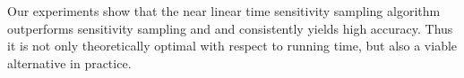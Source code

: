 Our experiments show that the near linear time sensitivity sampling algorithm outperforms sensitivity sampling and  and consistently yields high accuracy.
Thus it is not only theoretically optimal with respect to running time, but also a viable alternative in practice. 
%
%
%
%
%


%

